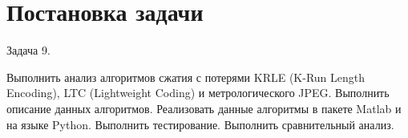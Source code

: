 \chapter{Постановка задачи}
\label{ch:intro}

Задача 9.

Выполнить анализ алгоритмов сжатия с потерями KRLE (K-Run Length Encoding), LTC
(Lightweight Coding) и метрологического JPEG. Выполнить описание данных алгоритмов.
Реализовать данные алгоритмы в пакете Matlab и на языке Python. Выполнить тестирование.
Выполнить сравнительный анализ.

\endinput